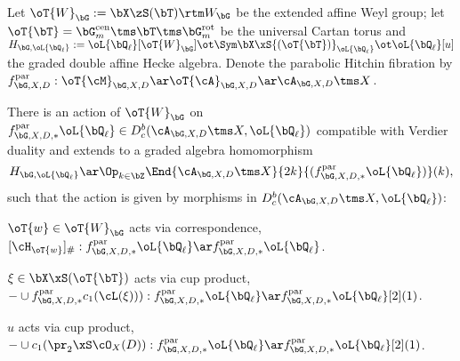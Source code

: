 \documentclass[article, a4paper, twoside]{universal}
\begin{document}

\begin{stp}
	Let $\oT{W}_{\bG}:=\bX\zS(\bT)\rtm W_{\bG}$ be the extended affine Weyl group; let $\oT{\bT}=\bG_{m}^{\text{cen}}\tms\bT\tms\bG_{m}^{\text{rot}}$ be the universal Cartan torus and $H_{\bG,\oL{\bQ_{\ell}}}:=\oL{\bQ_{\ell}}[\oT{W}_{\bG}]\ot\Sym\bX\xS{(\oT{\bT})}_{\oL{\bQ_{\ell}}}\ot\oL{\bQ_{\ell}}[u]$ the graded double affine Hecke algebra. Denote the parabolic Hitchin fibration by $f^{\text{par}}_{\bG,X,D}:\oT{\cM}_{\bG,X,D}\ar\oT{\cA}_{\bG,X,D}\ar\cA_{\bG,X,D}\tms X$.
\end{stp}

\begin{thm}
	There is an action of $\oT{W}_{\bG}$ on $f^{\text{par}}_{\bG,X,D,*}\oL{\bQ_{\ell}}\in D_{c}^{b}(\cA_{\bG,X,D}\tms X,\oL{\bQ_{\ell}})$ compatible with Verdier duality and extends to a graded algebra homomorphism
	\[
		H_{\bG,\oL{\bQ_{\ell}}}\ar\Op_{k\in\bZ}\End{\cA_{\bG,X,D}\tms X}{2k}{(f^{\text{par}}_{\bG,X,D,*}\oL{\bQ_{\ell}})}(k),
	\]
	such that the action is given by morphisms in $D_{c}^{b}(\cA_{\bG,X,D}\tms X, \oL{\bQ_{\ell}})$:
	\begin{itm}
		\item $\oT{w}\in\oT{W}_{\bG}$ acts via correspondence, $[\cH_{\oT{w}}]_{\#}:f^{\text{par}}_{\bG,X,D,*}\oL{\bQ_{\ell}}\ar f^{\text{par}}_{\bG,X,D,*}\oL{\bQ_{\ell}}$.
		\item $\xi\in\bX\xS(\oT{\bT})$ acts via cup product, $-\cup f_{\bG,X,D,*}^{\text{par}}c_{1}(\cL(\xi))):f^{\text{par}}_{\bG,X,D,*}\oL{\bQ_{\ell}}\ar f^{\text{par}}_{\bG,X,D,*}\oL{\bQ_{\ell}}[2](1)$.
		\item $u$ acts via cup product, $-\cup c_{1}(\pr_{2}\xS\cO_{X}(D)):f^{\text{par}}_{\bG,X,D,*}\oL{\bQ_{\ell}}\ar f^{\text{par}}_{\bG,X,D,*}\oL{\bQ_{\ell}}[2](1)$.
	\end{itm}
\end{thm}

\end{document}
